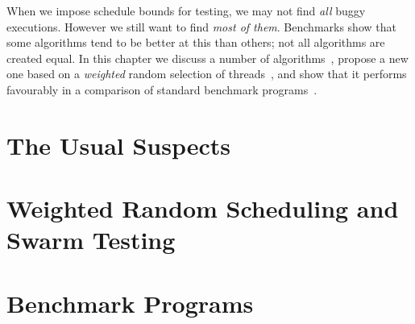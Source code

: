 \chapstart When we impose schedule bounds for testing, we may not find
\emph{all} buggy executions.  However we still want to find \emph{most of them}.
Benchmarks show that some algorithms tend to be better at this than others; not
all algorithms are created equal.  In this chapter we discuss a number of
algorithms~, propose a new one based on a \emph{weighted}
random selection of threads~, and show that it performs
favourably in a comparison of standard benchmark
programs~.

\section{The Usual Suspects}
\label{sec:algorithms-usual}

\blindtext

\section{Weighted Random Scheduling and Swarm Testing}
\label{sec:algorithms-swarm}

\blindtext

\section{Benchmark Programs}
\label{sec:algorithms-sctbench}

\blindtext
